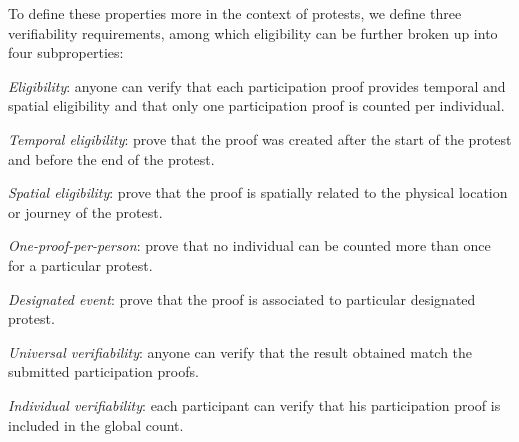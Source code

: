 To define these properties more in the context of protests, we define three 
verifiability requirements, among which eligibility can be further broken up 
into four subproperties:
\begin{requirements}[V]
  \item\label{EligibilityVerif} \emph{Eligibility}: anyone can verify that each participation proof provides temporal and spatial eligibility and that only one participation proof is counted per individual.
    \begin{requirements}
    \item\label{TemporallyRelated} \emph{Temporal eligibility}: prove that the proof was created after the start of the protest and before the end of the protest.
    \item\label{SpatiallyRelated} \emph{Spatial eligibility}: prove that the proof is spatially related to the physical location or journey of the protest.
    \item\label{CountOnce} \emph{One-proof-per-person}: prove that no individual can be counted more than once for a particular protest.
    \item\label{DesignatedEvent} \emph{Designated event}: prove that the proof is associated to particular designated protest.
    \end{requirements}

  \item\label{UniversalVerif} \emph{Universal verifiability}: anyone can verify that the result obtained match the submitted participation proofs.

  \item\label{IndividualVerif} \emph{Individual verifiability}: each participant can verify that his participation proof is included in the global count.
\end{requirements}

